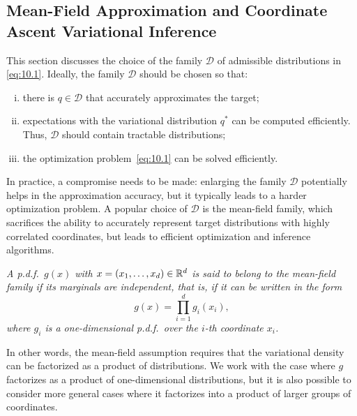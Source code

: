 \subsection{Mean-Field Approximation and Coordinate Ascent Variational Inference}
\label{sec:10.1.2}

This section discusses the choice of the family $\mathcal{D}$ of admissible distributions in
\eqref{eq:10.1}. Ideally, the family $\mathcal{D}$ should be chosen so that:
\begin{enumerate}[(i)]
  \item there is $q \in \mathcal{D}$ that accurately approximates the target;
  \item expectations with the variational distribution $q^*$ can be computed efficiently. Thus,
        $\mathcal{D}$ should contain tractable distributions;
  \item the optimization problem~\eqref{eq:10.1} can be solved efficiently.
\end{enumerate}

In practice, a compromise needs to be made: enlarging the family $\mathcal{D}$ potentially helps in
the approximation accuracy, but it typically leads to a harder optimization problem. A popular choice
of $\mathcal{D}$ is the mean-field family, which sacrifices the ability to accurately represent target
distributions with highly correlated coordinates, but leads to efficient optimization and inference
algorithms.

\begin{definition}
  \label{def:10.5}
  \textit{A p.d.f.\ $g(x)$ with $x = (x_1, \ldots, x_d) \in \mathbb{R}^d$ is said to belong to the
  mean-field family if its marginals are independent, that is, if it can be written in the form}
  \[
    g(x) = \prod_{i=1}^{d} g_i(x_i),
  \]
  \textit{where $g_i$ is a one-dimensional p.d.f.\ over the $i$-th coordinate $x_i$.}
\end{definition}

In other words, the mean-field assumption requires that the variational density can be factorized as
a product of distributions. We work with the case where $g$ factorizes as a product of
one-dimensional distributions, but it is also possible to consider more general cases where it
factorizes into a product of larger groups of coordinates.

\medskip
\noindent{}
\medskip

